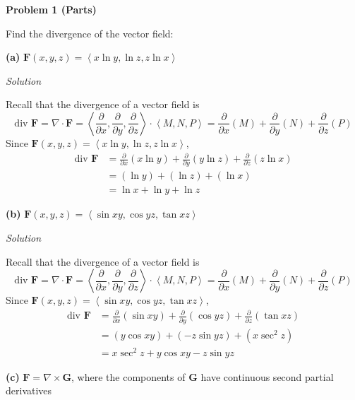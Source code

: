 \documentclass{article}
\newcommand{\lrp}[1]{\left( #1 \right)}
\newcommand{\lra}[1]{\left\langle #1 \right\rangle}
\newcommand{\F}[0]{\mathbf{F}}
\newcommand{\G}[0]{\mathbf{G}}
\newcommand{\Solution}{\textit{Solution}}
\begin{document}
{}\textbf{Problem 1 (Parts)}

Find the divergence of the vector field:

{}\textbf{(a)} $\F(x,y,z)=\lra{x\ln y, \ln z, z\ln x}$

\Solution

Recall that the divergence of a vector field is
\begin{equation*}
    \text{div }\F=\nabla \cdot \F=\lra{\frac{\partial }{\partial x},\frac{\partial }{\partial y},\frac{\partial }{\partial z}}\cdot \lra{M,N,P}=\frac{\partial}{\partial x}\lrp{M}+\frac{\partial}{\partial y}\lrp{N}+\frac{\partial}{\partial z}\lrp{P}
\end{equation*}
Since $\F(x,y,z)=\lra{x\ln y, \ln z, z\ln x}$,
\begin{align*}
  \text{div }\F&=\frac{\partial}{\partial x}(x\ln y) +\frac{\partial}{\partial y}(y \ln z) + \frac{\partial}{\partial z}(z \ln x)\\
  &=\lrp{\ln y }+ \lrp{\ln z }+ \lrp{\ln x}\\
  &=\boxed{\ln x + \ln y + \ln z}
\end{align*}

{}\textbf{(b)} $\F(x,y,z)=\lra{\sin xy, \cos yz, \tan xz}$

\Solution

Recall that the divergence of a vector field is
\begin{equation*}
    \text{div }\F=\nabla \cdot \F=\lra{\frac{\partial }{\partial x},\frac{\partial }{\partial y},\frac{\partial }{\partial z}}\cdot \lra{M,N,P}=\frac{\partial}{\partial x}\lrp{M}+\frac{\partial}{\partial y}\lrp{N}+\frac{\partial}{\partial z}\lrp{P}
\end{equation*}
Since $\F(x,y,z)=\lra{\sin xy, \cos yz, \tan xz}$,
\begin{align*}
  \text{div }\F&=\frac{\partial}{\partial x}(\sin xy) +\frac{\partial}{\partial y}(\cos yz) + \frac{\partial}{\partial z}(\tan xz)\\
  &=\lrp{y\cos xy }+ \lrp{-z\sin yz}+\lrp{ x\sec^2 z}\\
  &=\boxed{x\sec^2 z + y\cos xy - z\sin yz}
\end{align*}

{}\textbf{(c)} $\F=\nabla \times \G$, where the components of $\G$ have continuous second partial derivatives
\end{document}
